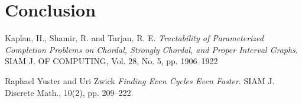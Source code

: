 \documentclass{article}
\begin{document}
	\section{Conclusion}

	\pagebreak
	
	\begin{thebibliography}{99}

		Kaplan, H., Shamir, R. and Tarjan, R. E. 
		\textit{Tractability of Parameterized Completion Problems on Chordal, Strongly Chordal, and Proper Interval Graphs}. 
		SIAM J. OF COMPUTING, Vol. 28, No. 5, pp. 1906--1922

		Raphael Yuster and Uri Zwick
		\textit{Finding Even Cycles Even Faster}.
		SIAM J. Discrete Math., 10(2), pp. 209--222.

	\end{thebibliography}

	\clearpage
\end{document}
